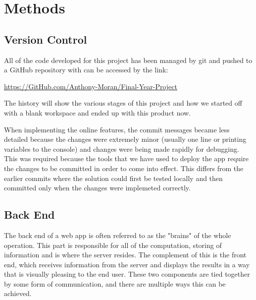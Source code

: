 \chapter{Methods}
\label{chapter2}

\section{Version Control}
\label{sec:VersionControl}
All of the code developed for this project has been managed by git and pushed to a GitHub repository with can be accessed by the link:

\begin{center}
    \url{https://GitHub.com/Anthony-Moran/Final-Year-Project}
\end{center}

The history will show the various stages of this project and how we started off with a blank workspace and ended up with this product now.

When implementing the online features, the commit messages became less detailed because the changes were extremely minor (usually one line or printing variables to the console) and changes were being made rapidly for debugging. This was required because the tools that we have used to deploy the app require the changes to be committed in order to come into effect. This differs from the earlier commits where the solution could first be tested locally and then committed only when the changes were implemeted correctly.

\section{Back End}

The back end of a web app is often referred to as the "brains" of the whole operation. This part is responsible for all of the computation, storing of information and is where the server resides. The complement of this is the front end, which receives information from the server and displays the results in a way that is visually pleasing to the end user. These two components are tied together by some form of communication, and there are multiple ways this can be achieved.

